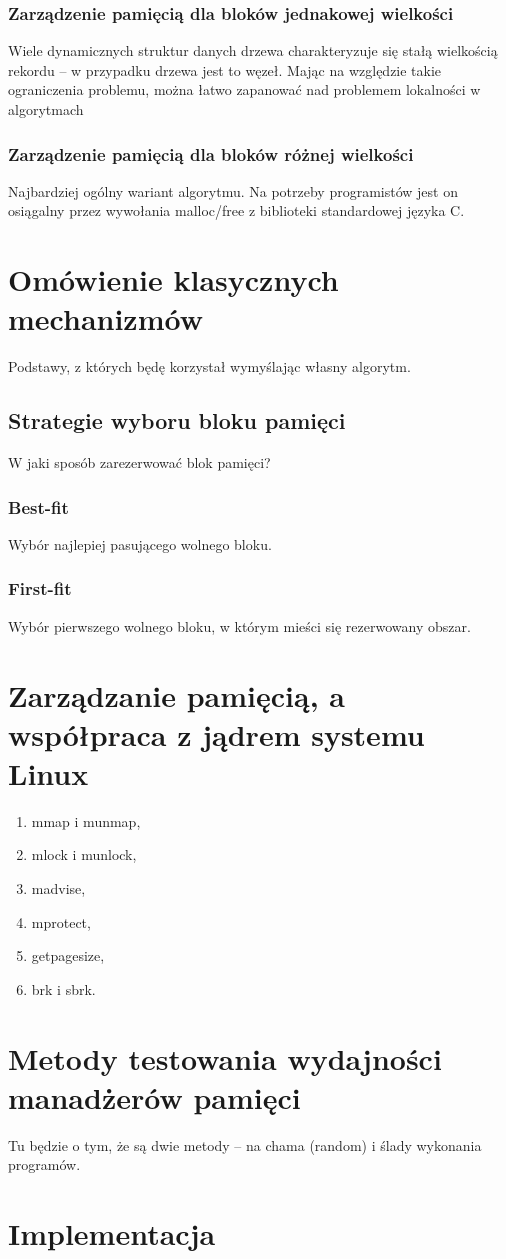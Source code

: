 \documentclass[12pt,a4paper,titlepage,twoside]{mwart}
\begin{document}
\subsubsection{Zarządzenie pamięcią dla bloków jednakowej wielkości}

Wiele dynamicznych struktur danych drzewa charakteryzuje się stałą wielkością
rekordu -- w przypadku drzewa jest to węzeł. Mając na względzie takie
ograniczenia problemu, można łatwo zapanować nad problemem lokalności w algorytmach

\subsubsection{Zarządzenie pamięcią dla bloków różnej wielkości}

Najbardziej ogólny wariant algorytmu. Na potrzeby programistów jest on
osiągalny przez wywołania malloc/free z biblioteki standardowej języka C.

\section{Omówienie klasycznych mechanizmów}

Podstawy, z których będę korzystał wymyślając własny algorytm.

\subsection{Strategie wyboru bloku pamięci}

W jaki sposób zarezerwować blok pamięci?

\subsubsection{Best-fit}

Wybór najlepiej pasującego wolnego bloku.

\subsubsection{First-fit}

Wybór pierwszego wolnego bloku, w którym mieści się rezerwowany obszar.

\section{Zarządzanie pamięcią, a współpraca z jądrem systemu Linux}

\begin{enumerate}
\item mmap i munmap,
\item mlock i munlock,
\item madvise,
\item mprotect,
\item getpagesize,
\item brk i sbrk.
\end{enumerate}

\section{Metody testowania wydajności manadżerów pamięci}

Tu będzie o tym, że są dwie metody -- na chama (random) i ślady wykonania programów.

\section{Implementacja}
\end{document}
